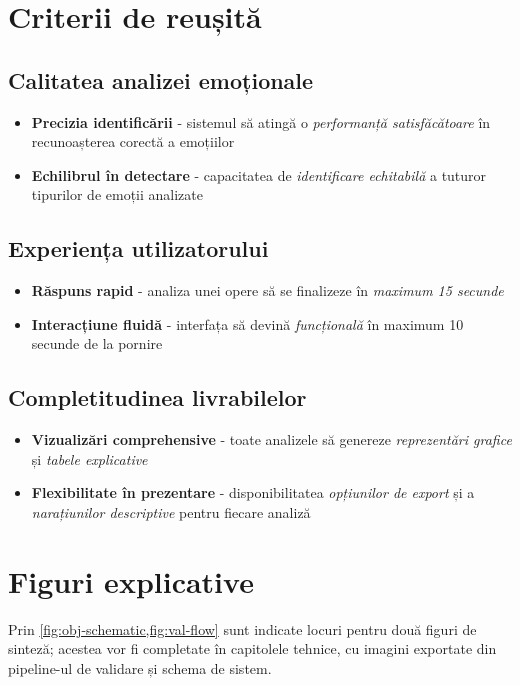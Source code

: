 \section{Criterii de reușită}
\label{sec:criterii-reusita}

\subsection{Calitatea analizei emoționale}
\begin{itemize}
  \item \textbf{Precizia identificării} - sistemul să atingă o \emph{performanță satisfăcătoare} în recunoașterea corectă a emoțiilor
  \item \textbf{Echilibrul în detectare} - capacitatea de \textit{identificare echitabilă} a tuturor tipurilor de emoții analizate
\end{itemize}

\subsection{Experiența utilizatorului}
\begin{itemize}
  \item \textbf{Răspuns rapid} - analiza unei opere să se finalizeze în \emph{maximum 15 secunde}
  \item \textbf{Interacțiune fluidă} - interfața să devină \textit{funcțională} în maximum 10 secunde de la pornire
\end{itemize}

\subsection{Completitudinea livrabilelor}
\begin{itemize}
  \item \textbf{Vizualizări comprehensive} - toate analizele să genereze \emph{reprezentări grafice} și \textit{tabele explicative}
  \item \textbf{Flexibilitate în prezentare} - disponibilitatea \emph{opțiunilor de export} și a \textit{narațiunilor descriptive} pentru fiecare analiză
\end{itemize}

\section{Figuri explicative}
\label{sec:figuri-explicative}

Prin \cref{fig:obj-schematic,fig:val-flow} sunt indicate locuri pentru două figuri de sinteză; acestea vor fi completate în capitolele tehnice, cu imagini exportate din pipeline-ul de validare și schema de sistem.

